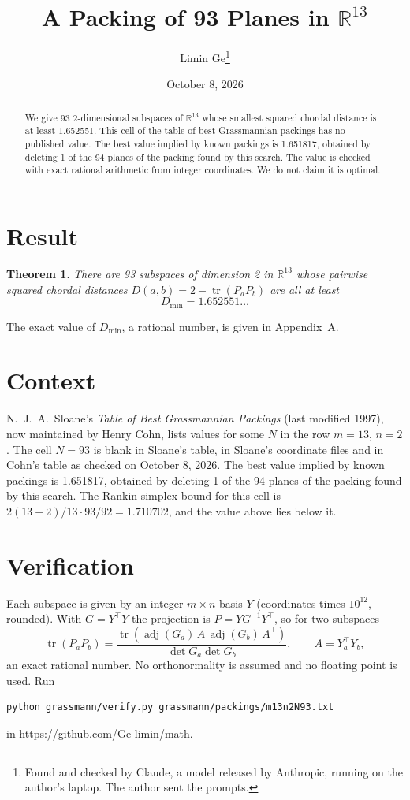 \documentclass[11pt,a4paper]{article}
\title{A Packing of 93 Planes in $\mathbb{R}^{13}$}
\author{Limin Ge\thanks{Found and checked by Claude, a model released by Anthropic, running on the author's laptop. The author sent the prompts.}}
\date{October 8, 2026}
\newtheorem*{theorem}{Theorem}
\begin{document}
\maketitle
\begin{abstract}
We give 93 2-dimensional subspaces of $\mathbb{R}^{13}$ whose smallest squared chordal distance is at least 1.652551. This cell of the table of best Grassmannian packings has no published value. The best value implied by known packings is 1.651817, obtained by deleting 1 of the 94 planes of the packing found by this search. The value is checked with exact rational arithmetic from integer coordinates. We do not claim it is optimal.
\end{abstract}

\section{Result}
\begin{theorem}
There are 93 subspaces of dimension 2 in $\mathbb{R}^{13}$ whose pairwise squared chordal distances $D(a,b) = 2 - \operatorname{tr}(P_aP_b)$ are all at least
\[ D_{\min} = 1.652551\ldots \]
\end{theorem}
The exact value of $D_{\min}$, a rational number, is given in Appendix~A.


\section{Context}
N.~J.~A.~Sloane's \emph{Table of Best Grassmannian Packings} (last modified 1997), now maintained by Henry Cohn, lists values for some $N$ in the row $m=13$, $n=2$. The cell $N=93$ is blank in Sloane's table, in Sloane's coordinate files and in Cohn's table as checked on October 8, 2026. The best value implied by known packings is 1.651817, obtained by deleting 1 of the 94 planes of the packing found by this search. The Rankin simplex bound for this cell is $2(13-2)/13\cdot 93/92 = 1.710702$, and the value above lies below it.


\section{Verification}
Each subspace is given by an integer $m\times n$ basis $Y$ (coordinates times $10^{12}$, rounded). With $G=Y^\top Y$ the projection is $P=YG^{-1}Y^\top$, so for two subspaces
\[ \operatorname{tr}(P_aP_b)=\frac{\operatorname{tr}(\operatorname{adj}(G_a)\,A\,\operatorname{adj}(G_b)\,A^\top)}{\det G_a\det G_b},\qquad A=Y_a^\top Y_b, \]
an exact rational number. No orthonormality is assumed and no floating point is used. Run
\begin{verbatim}
python grassmann/verify.py grassmann/packings/m13n2N93.txt
\end{verbatim}
in \url{https://github.com/Ge-limin/math}.
\end{document}
